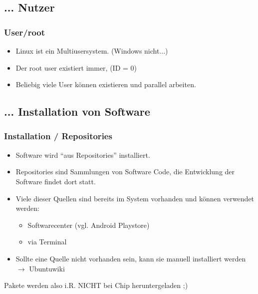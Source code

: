 \documentclass{beamer}
\begin{document}
        \subsection{... Nutzer}
            \begin{frame}
          		\frametitle{User/root}
        		\begin{minipage}{0.9\textwidth}
        		    \begin{itemize}
        		        \item Linux ist ein Multiusersystem. (Windows nicht...)
        		        \item Der root user existiert immer, (ID = 0)
        		        \item Beliebig viele User können existieren und parallel arbeiten.
        		    \end{itemize}
        		\end{minipage} 
        		
        		\begin{minipage}{0.54\textwidth}
        		
        		\end{minipage}
        	\end{frame}
        	
        \subsection{... Installation von Software}
            \begin{frame}
          		\frametitle{Installation / Repositories}
        		\begin{minipage}{0.99\textwidth}
        		    \begin{itemize}
        		        \item Software wird \enquote{aus Repositories} installiert.
        		        \item Repositories sind Sammlungen von Software Code, die Entwicklung der Software findet dort statt. 
        		        \item Viele dieser Quellen sind bereits im System vorhanden und können verwendet werden:
        		        \begin{itemize}
        		            \item Softwarecenter (vgl. Android Playstore)
        		            \item via Terminal
        		        \end{itemize}
        		        \item Sollte eine Quelle nicht vorhanden sein, kann sie manuell installiert werden $\to$ Ubuntuwiki
        		    \end{itemize}
        		    Pakete werden also i.R. NICHT bei Chip heruntergeladen ;)
        		\end{minipage}
        	\end{frame}
\end{document}
